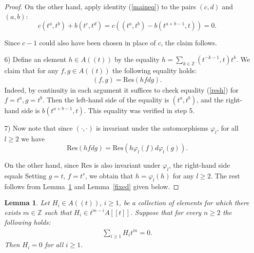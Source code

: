 \documentclass[11pt,a4paper]{article}
\theoremstyle{plain}
\newtheorem{lemma}{Lemma}
\newcommand{\res}{\mathrm{Res}}
\newcommand{\Z}{\mathbb{Z}}
\begin{document}
\begin{proof}
		On the other hand, apply identity (\ref{maineq})
		to the pairs $(c,d)$ and $(a,b)$:
		$$c(t^a, t^b) + b (t^c, t^d) = c((t^a, t^b) - b (t^{a+b-1}, t)) = 0.$$
		
		Since $c-1$ could also have been chosen in place of $c$, the claim follows.
		
		
		 6) Define an element $h \in A((t))$ by the equality
		$h = \sum_{k \in \Z} (t^{-k - 1}, t) t^{k}$.
		We claim that for any $f, g \in A((t))$ the following equality holds:
		\begin{align}\label{resh}
		(f,g) = \res(hf dg).
		\end{align}
		Indeed, by continuity in each argument it suffices to check equality (\ref{resh})
		for $f = t^a, g = t^b$.
		Then the left-hand side of the equality is $(t^a, t^b)$,
		and the right-hand side is $b(t^{a + b - 1}, t)$.
		This equality was verified in step 5.
		
		7) Now note that since $(\cdot, \cdot)$ is invariant
		under the automorphisms $\varphi_{l}$,
		for all $l \geq 2$ we have
		$$\res(h fdg) = \res(h \varphi_l(f) d \varphi_l(g)).$$
		
		On the other hand, since $\res$ is also invariant
		under $\varphi_{l}$,
		the right-hand side equals \linebreak{$\res(\varphi_{l}^{-1}(h) f dg).$}
		Setting $g = t$, $f = t^s$, we obtain
		that $h = \varphi_l(h)$ for any $l \geq 2$.
		The rest follows from Lemma~\ref{Hzero} and Lemma~\ref{fixed} given below.
\end{proof}
\begin{lemma}\label{Hzero}
Let $H_{i}\in A((t))$, $i\geq 1$, be a collection of elements for which there exists $m \in \Z$ such that $H_{i}\in t^{m-i}A[[t]]$. Suppose that for every $n\geq 2$ the following holds:
\begin{align}\label{sumHzero}
\sum_{i\geq 1} H_{i}t^{in} = 0.
\end{align}
Then $H_{i}=0$ for all $i\geq 1$.
\end{lemma}
\end{document}
